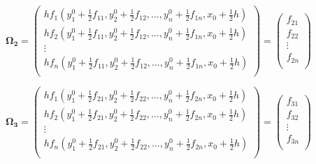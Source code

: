 \documentclass[a4paper]{article}
\begin{document}
\begin{equation}
{{\mathbf{\Omega }}_{\mathbf{2}}}=\left( \begin{matrix}
   h{{f}_{1}}(y_{1}^{0}+\tfrac{1}{2}{{f}_{11}},y_{2}^{0}+\tfrac{1}{2}{{f}_{12}},\ldots ,y_{n}^{0}+\tfrac{1}{2}{{f}_{1n}},{{x}_{0}}+\tfrac{1}{2}h)  \\
   h{{f}_{2}}(y_{1}^{0}+\tfrac{1}{2}{{f}_{11}},y_{2}^{0}+\tfrac{1}{2}{{f}_{12}},\ldots ,y_{n}^{0}+\tfrac{1}{2}{{f}_{1n}},{{x}_{0}}+\tfrac{1}{2}h)  \\
   \vdots   \\
   h{{f}_{n}}(y_{1}^{0}+\tfrac{1}{2}{{f}_{11}},y_{2}^{0}+\tfrac{1}{2}{{f}_{12}},\ldots ,y_{n}^{0}+\tfrac{1}{2}{{f}_{1n}},{{x}_{0}}+\tfrac{1}{2}h)  \\
\end{matrix} \right)=\left( \begin{matrix}
   {{f}_{21}}  \\
   {{f}_{22}}  \\
   \vdots   \\
   {{f}_{2n}}  \\
\end{matrix} \right)
\end{equation}

\begin{equation}
{{\mathbf{\Omega }}_{\mathbf{3}}}=\left( \begin{matrix}
   h{{f}_{1}}(y_{1}^{0}+\tfrac{1}{2}{{f}_{21}},y_{2}^{0}+\tfrac{1}{2}{{f}_{22}},\ldots ,y_{n}^{0}+\tfrac{1}{2}{{f}_{2n}},{{x}_{0}}+\tfrac{1}{2}h)  \\
   h{{f}_{2}}(y_{1}^{0}+\tfrac{1}{2}{{f}_{21}},y_{2}^{0}+\tfrac{1}{2}{{f}_{22}},\ldots ,y_{n}^{0}+\tfrac{1}{2}{{f}_{2n}},{{x}_{0}}+\tfrac{1}{2}h)  \\
   \vdots   \\
   h{{f}_{n}}(y_{1}^{0}+\tfrac{1}{2}{{f}_{21}},y_{2}^{0}+\tfrac{1}{2}{{f}_{22}},\ldots ,y_{n}^{0}+\tfrac{1}{2}{{f}_{2n}},{{x}_{0}}+\tfrac{1}{2}h)  \\
\end{matrix} \right)=\left( \begin{matrix}
   {{f}_{31}}  \\
   {{f}_{32}}  \\
   \vdots   \\
   {{f}_{3n}}  \\
\end{matrix} \right)
\end{equation}
\end{document}
